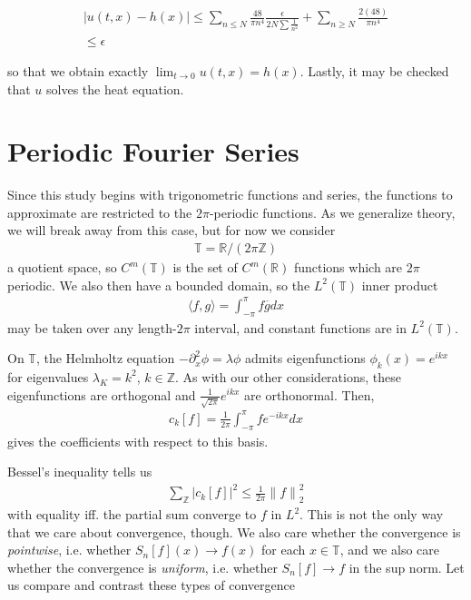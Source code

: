 \documentclass{article}
\newcommand{\R}{{\mathbb{R}}}
\newcommand{\Z}{{\mathbb{Z}}}
\newcommand{\bT}{\mathbb{T}}
\newcommand{\norm}[1]{{ \lVert {#1} \rVert}}
\newcommand{\cl}[1]{{\overline{#1}}}
\newcommand{\pd}{\partial}
\begin{document}
	\begin{align*}
		|u(t,x) - h(x)| \leq \sum_{n \leq N} \frac{48}{\pi n^{4}}\frac{\epsilon}{2N \sum \frac{1}{n^{2}}} + \sum_{n \geq N}\frac{2(48)}{\pi n^{4}} \\
		\leq \epsilon
	\end{align*}
	
	so that we obtain exactly $\lim_{t \to 0} u(t,x) = h(x)$. Lastly, it may be checked that $u$ solves the heat equation. 
	
	
	\section{Periodic Fourier Series}
	
	Since this study begins with trigonometric functions and series, the functions to approximate are restricted to the $2 \pi$-periodic functions. As we generalize theory, we will break away from this case, but for now we consider 
	\begin{align*}
		\mathbb{T} = \R / (2 \pi \Z)
	\end{align*}
	a quotient space, so $C^{m}(\mathbb{T})$ is the set of $C^{m}(\R)$ functions which are $2\pi$ periodic. We also then have a bounded domain, so the $L^{2}(\bT)$ inner product
	\begin{align*}
		\langle f,g \rangle  = \int_{-\pi}^{\pi} f \cl{g} dx
	\end{align*}
	may be taken over any length-$2\pi$ interval, and constant functions are in $L^{2}(\bT)$. 
	
	On $\bT$, the Helmholtz equation $- \pd_{x}^{2} \phi = \lambda \phi$ admits eigenfunctions $\phi_{k}(x) = e^{ikx}$ for eigenvalues $\lambda_{K} =k^{2}$, $k \in \Z$. As with our other considerations, these eigenfunctions are orthogonal and $\frac{1}{\sqrt{2\pi}} e^{ikx}$ are orthonormal. Then, 
	\begin{align*}
		c_{k}[f] = \frac{1}{2\pi} \int_{-\pi}^{\pi} f e^{-ikx} dx
	\end{align*}
	gives the coefficients with respect to this basis. 
	
	Bessel's inequality tells us 
	\begin{align*}
		\sum_{\Z} |c_{k}[f]|^{2} \leq \frac{1}{2\pi} \norm{f}_{2}^{2}
	\end{align*}
	with equality iff. the partial sum converge to $f$ in $L^{2}$. This is not the only way that we care about convergence, though. We also care whether the convergence is \textit{pointwise}, i.e. whether $S_{n}[f](x) \to f(x)$ for each $x \in \bT$, and we also care whether the convergence is \textit{uniform}, i.e. whether $S_{n}[f] \to f$ in the sup norm. Let us compare and contrast these types of convergence 
	
\end{document}
